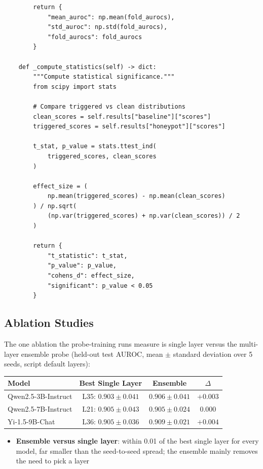 \documentclass[11pt,letterpaper]{article}
\let\origsubsection\subsection
\renewcommand{\subsection}{\needspace{8\baselineskip}\origsubsection}}
\begin{document}
\begin{recipebox}
\begin{lstlisting}
        return {
            "mean_auroc": np.mean(fold_aurocs),
            "std_auroc": np.std(fold_aurocs),
            "fold_aurocs": fold_aurocs
        }

    def _compute_statistics(self) -> dict:
        """Compute statistical significance."""
        from scipy import stats

        # Compare triggered vs clean distributions
        clean_scores = self.results["baseline"]["scores"]
        triggered_scores = self.results["honeypot"]["scores"]

        t_stat, p_value = stats.ttest_ind(
            triggered_scores, clean_scores
        )

        effect_size = (
            np.mean(triggered_scores) - np.mean(clean_scores)
        ) / np.sqrt(
            (np.var(triggered_scores) + np.var(clean_scores)) / 2
        )

        return {
            "t_statistic": t_stat,
            "p_value": p_value,
            "cohens_d": effect_size,
            "significant": p_value < 0.05
        }
\end{lstlisting}
\end{recipebox}

\subsection{Ablation Studies}

The one ablation the probe-training runs measure is single layer versus the multi-layer ensemble probe (held-out test AUROC, mean $\pm$ standard deviation over 5 seeds, script default layers):

\begin{center}
\begin{tabular}{lccc}
\toprule
\textbf{Model} & \textbf{Best Single Layer} & \textbf{Ensemble} & \textbf{$\Delta$} \\
\midrule
\rowcolor{backgroundgray} Qwen2.5-3B-Instruct & L35: $0.903 \pm 0.041$ & $0.906 \pm 0.041$ & $+0.003$ \\
Qwen2.5-7B-Instruct & L21: $0.905 \pm 0.043$ & $0.905 \pm 0.024$ & $0.000$ \\
\rowcolor{backgroundgray} Yi-1.5-9B-Chat & L36: $0.905 \pm 0.036$ & $0.909 \pm 0.021$ & $+0.004$ \\
\bottomrule
\end{tabular}
\end{center}

\begin{infobox}
\begin{itemize}
  \item \textbf{Ensemble versus single layer}: within 0.01 of the best single layer for every model, far smaller than the seed-to-seed spread; the ensemble mainly removes the need to pick a layer
\end{itemize}
\end{infobox}
\end{document}
